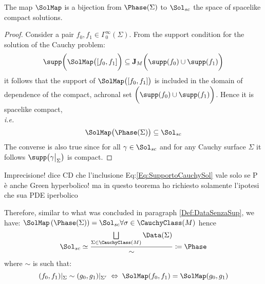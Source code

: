 \documentclass[Main]{subfiles}
\begin{document}
			\begin{proposition}
				The map $\SolMap$ is a bijection from $\Phase(\Sigma)$ to $\Sol_{sc}$ the space of spacelike compact solutions.			
			\end{proposition}
			\begin{proof}
				Consider a pair $f_0, f_1 \in \Gamma_0^\infty(\Sigma)$. From the support condition for the solution of the Cauchy problem:
				\begin{equation}\label{Eq:SupportoCauchySol}
					\supp\biggr( \SolMap \big([f_0,f_1] \biggr) \subseteq \mathbf{J}_M \biggr( \supp(f_0) \cup \supp(f_1) \biggr)
				\end{equation}
				it follows that the support of $\SolMap \big([f_0,f_1]\big) $	is included in the domain of dependence of the compact, achronal	set $\biggr( \supp(f_0) \cup \supp(f_1) \biggr)$.
				Hence it is spacelike compact,\\ \textit{i.e.}
				\begin{displaymath}
					\SolMap \big( \Phase(\Sigma)\big) \subseteq \Sol_{sc}
				\end{displaymath}
				The converse is also true since for all $\gamma \in \Sol_{sc}$ and for any Cauchy surface $\Sigma$ it follows $\supp\big( \gamma \big\vert_\Sigma \big)$ is compact.
			\end{proof}
%				
\ifToninus
	\begin{Warning}
		Imprecisione! dice CD che l'inclusione Eq:\ref{Eq:SupportoCauchySol} vale solo se P è anche Green hyperbolico! ma in questo teorema ho richiesto solamente l'ipotesi che sua PDE iperbolico
	\end{Warning}				
\fi
%			
			Therefore, similar to what was concluded in paragraph  \ref{Def:DataSenzaSup}, we have:
			$ \SolMap \left( \Phase(\Sigma) \right) = \Sol_{sc} \forall \sigma \in \CauchyClass(M)$
			hence
			\begin{equation}
				\Sol_{sc} \simeq \frac{\bigsqcup\limits_{\Sigma \in \CauchyClass(M)}\Data(\Sigma)}{\sim} \coloneqq \Phase
			\end{equation}
				where $\sim$ is such that:
				\begin{displaymath}
					(f_0, f_1)|_\Sigma \sim (g_0, g_1)|_{\Sigma'} \; \Leftrightarrow \; \SolMap(f_0,f_1) =  \SolMap(g_0,g_1) 
				\end{displaymath}
\end{document}
